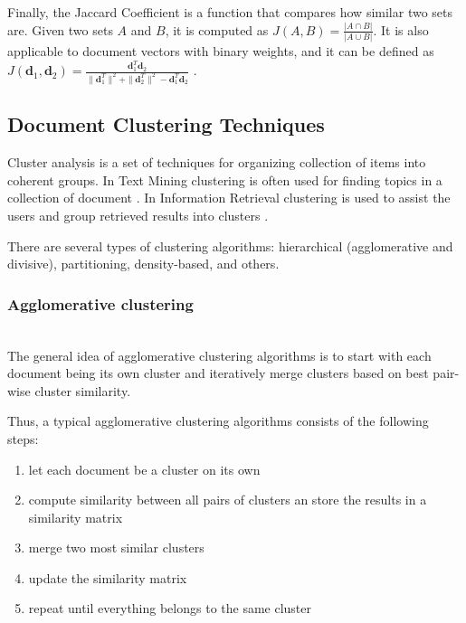 Finally, the Jaccard Coefficient is a function that compares how similar
two sets are. Given two sets $A$ and $B$, it is computed as
$J(A, B) = \frac{|A \cap B|}{|A \cup B|}$.
It is also applicable to document vectors with binary weights, and it can
be defined as $J(\mathbf d_1, \mathbf d_2) =
\frac{\mathbf d_1^T \mathbf d_2}{\| \mathbf d_1^T \|^2 + \| \mathbf d_2^T \|^2 - \mathbf d_1^T \mathbf d_2}$ \cite{manning2008introduction}.



\subsection{Document Clustering Techniques} \label{sec:doc-clustering}

Cluster analysis is a set of techniques for organizing collection
of items into coherent groups. In Text Mining clustering is often
used for finding topics in a collection of document \cite{aggarwal2012survey}.
In Information Retrieval clustering is used to assist the users and group
retrieved results into clusters \cite{cutting1992scatter}.

There are several types of clustering algorithms:
hierarchical (agglomerative and divisive), partitioning,
density-based, and others.


\subsubsection{Agglomerative clustering} \label{sec:clustering-heierarchical} \ \\

The general idea of agglomerative clustering algorithms is to start with
each document being its own cluster and iteratively merge clusters based
on best pair-wise cluster similarity.

Thus, a typical agglomerative clustering algorithms consists of the following steps:

\begin{enumerate}
\itemsep1pt\parskip0pt
  \item let each document be a cluster on its own
  \item compute similarity between all pairs of clusters an store the
      results in a similarity matrix
  \item merge two most similar clusters
  \item update the similarity matrix
  \item repeat until everything belongs to the same cluster
\end{enumerate}

